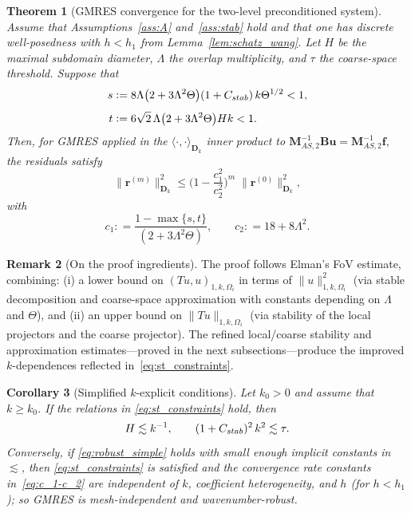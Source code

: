 \documentclass[preprint,3p,times]{elsarticle}
\newcommand{\assign}{\mathrel{\mathop:}=}
\newcommand{\Cstab}{C_{\textup{\textsf{stab}}}}
\newtheorem{theorem}{Theorem}[section]
\newtheorem{corollary}[theorem]{Corollary}
\theoremstyle{definition}
\newtheorem{remark}[theorem]{Remark}
\numberwithin{equation}{section}
\begin{document}
\begin{theorem}[GMRES convergence for the two-level preconditioned system]
\label{thm:convergence}
Assume that Assumptions~\ref{ass:A} and~\ref{ass:stab} hold and that one has discrete well-posedness with $h < h_1$ from Lemma~\ref{lem:schatz_wang}. 
Let $H$ be the maximal subdomain diameter, $\Lambda$ the overlap multiplicity, and $\tau$ the coarse-space threshold.  Suppose that
\begin{equation}
\label{eq:st_constraints}
\begin{aligned}
	s &\assign 8\Lambda\bigl(2+3\Lambda^2\Theta\bigr)(1+\Cstab)\,k\Theta^{1/2} < 1, 
	\\[1ex]
	t &\assign 6\sqrt{2}\,\Lambda\bigl(2+3\Lambda^2\Theta\bigr) H k < 1.
\end{aligned}
\end{equation}
Then, for GMRES applied in the $\langle\cdot,\cdot\rangle_{\mathbf{D}_k}$ inner product to
\(
	\mathbf{M}^{-1}_{\!AS,2}\mathbf{B}\mathbf{u}=\mathbf{M}^{-1}_{\!AS,2}\mathbf{f},
\)
the residuals satisfy
\begin{equation}
\label{eq:gmres_rate}
	\|\mathbf{r}^{(m)}\|_{\mathbf{D}_k}^2 
	\le \biggl(1-\frac{c_1^2}{c_2^2}\biggr)^{\!m}\;\|\mathbf{r}^{(0)}\|_{\mathbf{D}_k}^2,
\end{equation}
with
\begin{equation}\label{eq:c_1-c_2}
	c_1 \assign \frac{1-\max\{s,t\}}{(2+3\Lambda^2\Theta)},
	\qquad
	c_2 \assign 18+8\Lambda^2.
\end{equation}
\end{theorem}

\begin{remark}[On the proof ingredients]
The proof follows Elman's FoV estimate, combining: (i) a lower bound on $(Tu,u)_{1, k, \Omega_i}$ in terms of $\|u\|_{1, k, \Omega_i}^2$ 
(via stable decomposition and coarse-space approximation with constants depending on $\Lambda$ and $\Theta$), 
and (ii) an upper bound on $\|Tu\|_{1, k, \Omega_i}$ (via stability of the local projectors and the coarse projector). 
The refined local/coarse stability and approximation estimates---proved in the next subsections---produce 
the improved $k$-dependences reflected in~\eqref{eq:st_constraints}.
\end{remark}

\begin{corollary}[Simplified $k$-explicit conditions]
\label{cor:robust}
Let $k_0>0$ and assume that $k\ge k_0$.  If the relations in \eqref{eq:st_constraints} hold, then
\begin{equation}
	\label{eq:robust_simple}
	H \lesssim k^{-1},
	\qquad
	(1+\Cstab)^2\,k^2 \lesssim \tau.
\end{equation}
Conversely, if \eqref{eq:robust_simple} holds with small enough implicit constants in $\lesssim$, 
then \eqref{eq:st_constraints} is satisfied and the convergence rate constants in~\eqref{eq:c_1-c_2} are independent of $k$, 
coefficient heterogeneity, and $h$ (for $h < h_1$); so GMRES is mesh-independent and wavenumber-robust.

\end{corollary}
\end{document}
